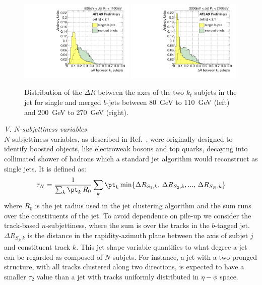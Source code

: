 \begin{figure}[tp]
\centering
\includegraphics[width=0.49\textwidth]{FIGS/VarsSingleMerged/DRkt2axes080.pdf}
\includegraphics[width=0.49\textwidth]{FIGS/VarsSingleMerged/DRkt2axes200.pdf}
\caption{Distribution of the $\Delta R$ between the axes of the two $k_t$ subjets in the jet for single and merged $b$-jets between 80~GeV to 110~GeV (left) and 200~GeV to 270~GeV (right).}
\label{fig:drktsinglemerged}
\end{figure}


{ \em V. $N$-subjettiness variables}
\\[3mm]

$N$-subjettiness variables, as described in Ref.~\cite{nsubjettiness}, were originally designed to identify boosted objects, like electroweak bosons and top quarks, decaying into collimated shower of hadrons which a standard jet algorithm would reconstruct as single jets. It is defined as:
\begin{equation} 
\tau_N = \frac{1}{\sum_k {\pt}_k\,R_0} \sum_k {\pt}_k \min \{ \Delta R_{S_1,k},\,\Delta R_{S_2,k},...,\,\Delta R_{S_N,k} \}
\end{equation} 
where $R_0$ is the jet radius used in the jet clustering algorithm and the sum runs over the constituents of the jet. To avoid dependence on pile-up we consider the track-based $n$-subjettiness, where the sum 
 is over the tracks in the $b$-tagged jet. $\Delta R_{S_j,k} $ is the distance in the rapidity-azimuth plane between the axis of subjet $j$ and constituent track $k$. This jet shape variable quantifies to what degree a jet can be regarded as composed of $N$ subjets. For instance, a jet with a two pronged structure, with all tracks clustered along two directions, is expected to have a smaller $\tau_2$ value than a jet with tracks uniformly distributed in $\eta-\phi$ space.

